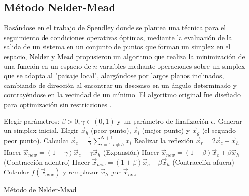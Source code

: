\subsection{Método Nelder-Mead}\label{sec: Metodo NM}
Basándose  en el trabajo de Spendley \cite{spendley_sequential_1962} donde se plantea una técnica para el seguimiento de condiciones operativas óptimas, mediante la evaluación de la salida de un sistema en un conjunto de puntos que forman un simplex en el espacio, Nelder y Mead propusieron un algoritmo que realiza la minimización de una función en un espacio de $n$ variables mediante operaciones sobre un simplex que se adapta al  "paisaje local", alargándose por largos planos inclinados, cambiando de dirección al encontrar un descenso en un ángulo determinado y contrayéndose en la vecindad de un mínimo. El algoritmo original fue diseñado para optimización sin restricciones \cite{nelder_simplex_1965}.
\begin{algorithm}
	\begin{algorithmic}[1]
		\STATE Elegir parámetros: $\beta>0, \gamma \in (0,1)$ y un parámetro de finalización $\epsilon$. 
		\STATE Generar un simplex inicial.
		\label{lin:lineaRara}
		\STATE Elegir $\vec{x}_h$ (peor punto), $\vec{x}_l$ (mejor punto) y $\vec{x}_g$ (el segundo peor punto).
		\STATE Calcular $\vec{x}_c=\frac{1}{N} \sum_{i=1, i\neq h }^{N+1} x_i$
		\STATE Realizar la reflexión $\vec{x}_r=2\vec{x}_c -\vec{x}_h$
		\STATE Hacer $\vec{x}_{new}=(1+\gamma)\vec{x}_c-\gamma \vec{x}_h$ (Expansión)
		\ELSE {}
		\STATE Hacer $\vec{x}_{new}=(1-\beta)\vec{x}_c+\beta \vec{x}_h$ (Contracción adentro)
		\ENDIF
		\ELSE {}
		\STATE Hacer $\vec{x}_{new}=(1+\beta)\vec{x}_c-\beta \vec{x}_h$ (Contracción afuera)
		\ENDIF
		\ENDIF
		\STATE Calcular $f(\vec{x}_{new})$ y remplazar $\vec{x}_h$ por $\vec{x}_{new}$
		\ENDWHILE
	\end{algorithmic}
	\caption{Método de Nelder-Mead}\label{alg:Nelder Mead}
\end{algorithm}

